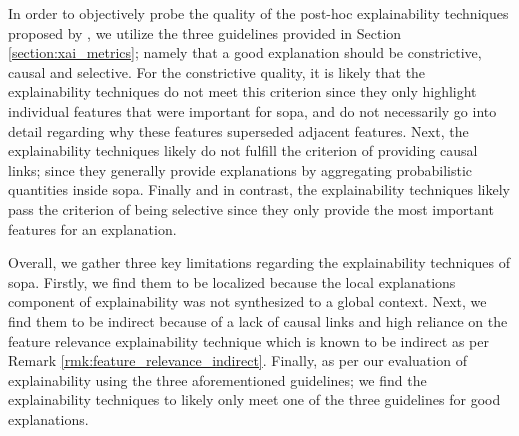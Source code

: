 In order to objectively probe the quality of the post-hoc explainability
techniques proposed by \citet{schwartz2018sopa}, we utilize the three guidelines
provided in Section \ref{section:xai_metrics}; namely that a good explanation
should be constrictive, causal and selective. For the constrictive quality, it
is likely that the explainability techniques do not meet this criterion since they
only highlight individual features that were important for \ac{sopa}, and do not
necessarily go into detail regarding why these features superseded adjacent
features. Next, the explainability techniques likely do not fulfill the criterion
of providing causal links; since they generally provide explanations by
aggregating probabilistic quantities inside \ac{sopa}. Finally and in
contrast, the explainability techniques likely pass the criterion of being
selective since they only provide the most important features for an
explanation.

Overall, we gather three key limitations regarding the explainability techniques
of \ac{sopa}. Firstly, we find them to be localized because the local explanations
component of explainability was not synthesized to a global context. Next, we
find them to be indirect because of a lack of causal links and high reliance on
the feature relevance explainability technique which is known to be indirect as
per Remark \ref{rmk:feature_relevance_indirect}. Finally, as per our evaluation
of explainability using the three aforementioned guidelines; we find the
explainability techniques to likely only meet one of the three guidelines for
good explanations.

